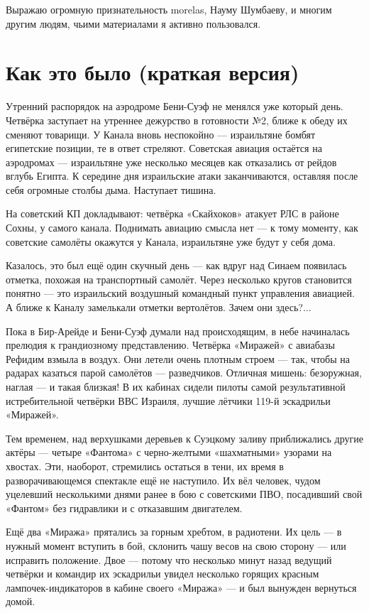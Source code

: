 Выражаю огромную признательность morelas, Науму Шумбаеву, и многим другим людям, чьими материалами я активно пользовался.

\section{Как это было (краткая версия)}

Утренний распорядок на аэродроме Бени-Суэф не менялся уже который день. Четвёрка заступает на утреннее дежурство в готовности №2, ближе к обеду их сменяют товарищи. У Канала вновь неспокойно — израильтяне бомбят египетские позиции, те в ответ стреляют. Советская авиация остаётся на аэродромах — израильтяне уже несколько месяцев как отказались от рейдов вглубь Египта. К середине дня израильские атаки заканчиваются, оставляя после себя огромные столбы дыма. Наступает тишина.

На советский КП докладывают: четвёрка «Скайхоков» атакует РЛС в районе Сохны, у самого канала. Поднимать авиацию смысла нет — к тому моменту, как советские самолёты окажутся у Канала, израильтяне уже будут у себя дома.

Казалось, это был ещё один скучный день — как вдруг над Синаем появилась отметка, похожая на транспортный самолёт. Через несколько кругов становится понятно — это израильский воздушный командный пункт управления авиацией. А ближе к Каналу замелькали отметки вертолётов. Зачем они здесь?...

Пока в Бир-Арейде и Бени-Суэф думали над происходящим, в небе начиналась прелюдия к грандиозному представлению. Четвёрка «Миражей» с авиабазы Рефидим взмыла в воздух. Они летели очень плотным строем — так, чтобы на радарах казаться парой самолётов — разведчиков. Отличная мишень: безоружная, наглая — и такая близкая! В их кабинах сидели пилоты самой результативной истребительной четвёрки ВВС Израиля, лучшие лётчики 119-й эскадрильи «Миражей».

Тем временем, над верхушками деревьев к Суэцкому заливу приближались другие актёры — четыре «Фантома» с черно-желтыми «шахматными» узорами на хвостах. Эти, наоборот, стремились остаться в тени, их время в разворачивающемся спектакле ещё не наступило. Их вёл человек, чудом уцелевший несколькими днями ранее в бою с советскими ПВО, посадивший свой «Фантом» без гидравлики и с отказавшим двигателем.

Ещё два «Миража» прятались за горным хребтом, в радиотени. Их цель — в нужный момент вступить в бой, склонить чашу весов на свою сторону — или исправить положение. Двое — потому что несколько минут назад ведущий четвёрки и командир их эскадрильи увидел несколько горящих красным лампочек-индикаторов в кабине своего «Миража» — и был вынужден вернуться домой.

